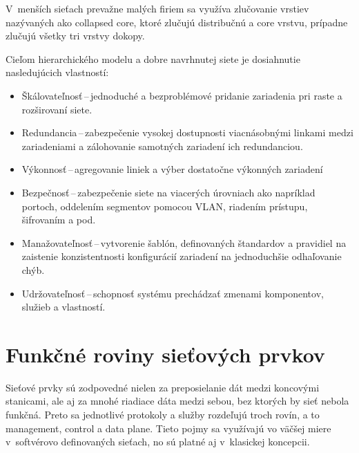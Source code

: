 \noindent
\vspace{2em}
V~menších sieťach prevažne malých firiem sa využíva zlučovanie vrstiev nazývaných ako collapsed core, ktoré zlučujú distribučnú a core vrstvu, prípadne zlučujú všetky tri vrstvy dokopy. 

\noindent
Cieľom hierarchického modelu a dobre navrhnutej siete je dosiahnutie nasledujúcich vlastností:

\begin{itemize}
	\item Škálovateľnosť\,--\,jednoduché a bezproblémové pridanie zariadenia pri raste a rozširovaní siete.
	\item Redundancia\,--\,zabezpečenie vysokej dostupnosti viacnásobnými linkami medzi zariadeniami a zálohovanie samotných zariadení ich redundanciou.
	\item Výkonnosť\,--\,agregovanie liniek a výber dostatočne výkonných zariadení
	\item Bezpečnosť\,--\,zabezpečenie siete na viacerých úrovniach ako napríklad portoch, oddelením segmentov pomocou VLAN, riadením prístupu, šifrovaním a pod.
	\item Manažovateľnosť\,--\,vytvorenie šablón, definovaných štandardov a pravidiel na zaistenie konzistentnosti konfigurácií zariadení na jednoduchšie odhaľovanie chýb. 
	\item Udržovateľnosť\,--\,schopnosť systému prechádzať zmenami komponentov, služieb a vlastností.
\end{itemize}



\section{Funkčné roviny sieťových prvkov}
Sieťové prvky sú zodpovedné nielen za preposielanie dát medzi koncovými stanicami, ale aj za mnohé riadiace dáta medzi sebou, bez ktorých by sieť nebola funkčná. Preto sa jednotlivé protokoly a služby rozdeľujú troch rovín, a to management, control a data plane. Tieto pojmy sa využívajú vo väčšej miere v~softvérovo definovaných sieťach, no sú platné aj v~klasickej koncepcii.
 
